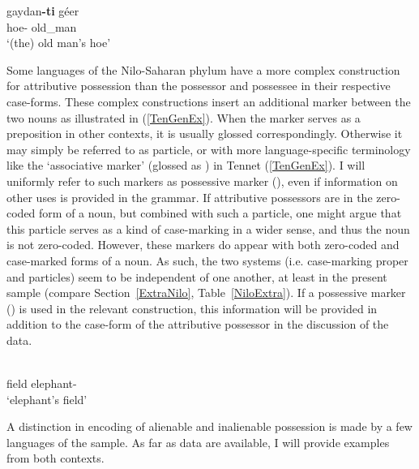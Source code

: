 
\begin{exe}\ex\label{ArbAntiGen}
\gll gaydan\textbf{-ti} g\'eer\\
 hoe-\antgen{} old\_man\\
 \glt `(the) old man's hoe'
 \end{exe} 
 
Some languages of the Nilo-Saharan phylum have a more complex construction for attributive possession than the possessor and possessee in their respective case-forms.
These complex constructions insert an additional marker between the two nouns as illustrated in (\ref{TenGenEx}). 
When the marker serves as a preposition in other contexts, it is usually glossed correspondingly. 
Otherwise it may simply be referred to as particle, or with more language-specific terminology like the `associative marker' (glossed as \am{}) in Tennet (\ref{TenGenEx}).
I will uniformly refer to such markers as possessive marker (\poss{}), even if information on other uses is provided in the grammar.
If attributive possessors are in the zero-coded form of a noun, but combined with such a particle, one might argue that this particle serves as a kind of case-marking in a wider sense, and thus the noun is not zero-coded.
However, these markers do appear with both zero-coded and case-marked forms of a noun.
As such, the two systems (i.e. case-marking proper and particles) seem to be independent of one another, at least in the present sample (compare Section~\ref{ExtraNilo}, Table~\ref{NiloExtra}). 
If a possessive marker (\poss{}) is used in the relevant construction, this information will be provided in addition to the case-form of the attributive possessor in the discussion of the data.

\pagebreak

\begin{exe} 
\ex\label{TenGenEx}
\gll{}   \\
field \am{} elephant-\gen{}\\
\glt `elephant's field'  
\end{exe}
 
A distinction in encoding of alienable and inalienable possession is made by a few languages of the sample. 
As far as data are available, I will provide examples from both contexts.

